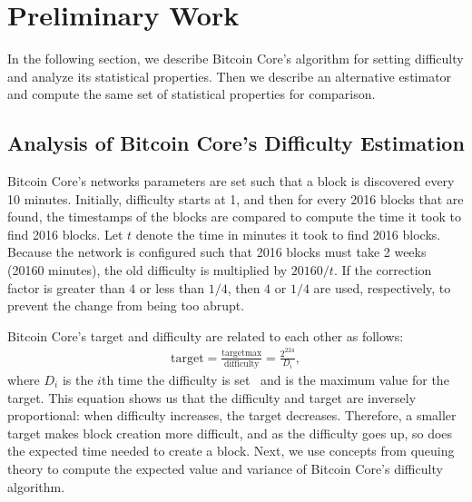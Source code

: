 \section{Preliminary Work}
In the following section, we describe Bitcoin Core's algorithm for setting difficulty and analyze its statistical properties. Then we describe an alternative estimator and compute the same set of statistical properties for comparison.
\subsection{Analysis of Bitcoin Core's Difficulty Estimation}
 Bitcoin Core's networks parameters are set such that a block is discovered every 10 minutes. Initially, difficulty starts at 1, and then for every 2016 blocks that are found, the timestamps of the blocks are compared to compute the time it took to find 2016 blocks. Let $t$ denote the time in minutes it took to find 2016 blocks. Because the network is configured such that 2016 blocks must take 2 weeks (20160 minutes), the old difficulty is multiplied by $20160 / t$. If the correction factor is greater than $4$ or less than $1/4$, then $4$ or $1/4$ are used, respectively, to prevent the change from being too abrupt.
\par \noindent Bitcoin Core's target and difficulty are related to each other as follows:
\begin{align}
\text{target} = \frac{\text{targetmax}}{\text{difficulty}} = \frac{2^{224}}{{D_i}},
\end{align} 
where $D_i$ is the $i$th time the difficulty is set~\cite{bitcoin:difficulty} and  is the maximum value for the target. This equation shows us that the difficulty and target are inversely proportional: when difficulty increases, the target decreases. Therefore, a smaller target makes block creation more difficult, and as the difficulty goes up, so does the expected time needed to create a block. Next, we use concepts from queuing theory to compute the expected value and variance of Bitcoin Core's difficulty algorithm.

